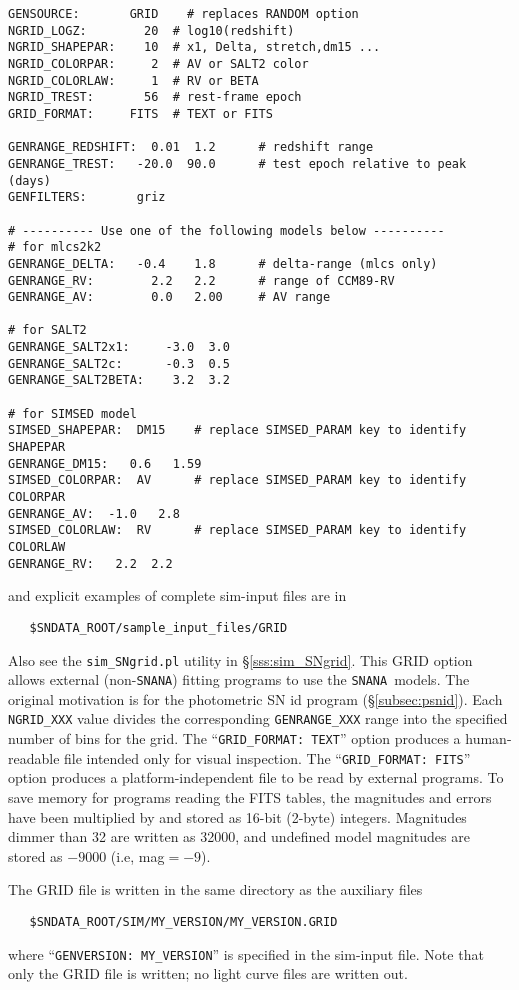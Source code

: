 \documentclass[12pt]{article}
\newcommand{\snana}{{\tt SNANA}}
\begin{document}
\begin{Verbatim}[frame=single]
GENSOURCE:       GRID    # replaces RANDOM option
NGRID_LOGZ:        20  # log10(redshift)
NGRID_SHAPEPAR:    10  # x1, Delta, stretch,dm15 ...
NGRID_COLORPAR:     2  # AV or SALT2 color
NGRID_COLORLAW:     1  # RV or BETA
NGRID_TREST:       56  # rest-frame epoch 
GRID_FORMAT:     FITS  # TEXT or FITS

GENRANGE_REDSHIFT:  0.01  1.2      # redshift range
GENRANGE_TREST:   -20.0  90.0      # test epoch relative to peak (days)
GENFILTERS:       griz

# ---------- Use one of the following models below ----------
# for mlcs2k2
GENRANGE_DELTA:   -0.4    1.8      # delta-range (mlcs only)
GENRANGE_RV:        2.2   2.2      # range of CCM89-RV
GENRANGE_AV:        0.0   2.00     # AV range

# for SALT2
GENRANGE_SALT2x1:     -3.0  3.0
GENRANGE_SALT2c:      -0.3  0.5
GENRANGE_SALT2BETA:    3.2  3.2

# for SIMSED model
SIMSED_SHAPEPAR:  DM15    # replace SIMSED_PARAM key to identify SHAPEPAR
GENRANGE_DM15:   0.6   1.59
SIMSED_COLORPAR:  AV      # replace SIMSED_PARAM key to identify COLORPAR
GENRANGE_AV:  -1.0   2.8
SIMSED_COLORLAW:  RV      # replace SIMSED_PARAM key to identify COLORLAW
GENRANGE_RV:   2.2  2.2
\end{Verbatim}
%
and explicit examples of complete sim-input files are in
\begin{verbatim}
   $SNDATA_ROOT/sample_input_files/GRID
\end{verbatim}
Also see the {\tt sim\_SNgrid.pl} utility in 
\S\ref{sss:sim_SNgrid}.
This GRID option allows external (non-{\snana}) fitting programs to
use the \snana\ models. The original motivation is for the
photometric SN id program  (\S\ref{subsec:psnid}).
Each {\tt NGRID\_XXX} value divides the 
corresponding {\tt GENRANGE\_XXX} range into the specified
number of bins for the grid.
The ``{\tt GRID\_FORMAT: TEXT}'' option produces a human-readable
file intended only for visual inspection.
The ``{\tt GRID\_FORMAT: FITS}'' option produces a platform-independent 
file to be read by external programs.
To save memory for programs reading the FITS tables,
the magnitudes and errors have been multiplied by {\MAGPACK}
and stored as 16-bit (2-byte) integers.
Magnitudes dimmer than 32 are written as 32000,
and undefined model magnitudes are stored as $-9000$
(i.e, mag$=-9$).


The GRID file is written in the same directory as the 
auxiliary files
\begin{verbatim}
   $SNDATA_ROOT/SIM/MY_VERSION/MY_VERSION.GRID
\end{verbatim}
%
where ``{\tt GENVERSION: MY\_VERSION}'' is specified in 
the sim-input file. Note that only the GRID file is written;
no light curve files are written out.
\end{document}
